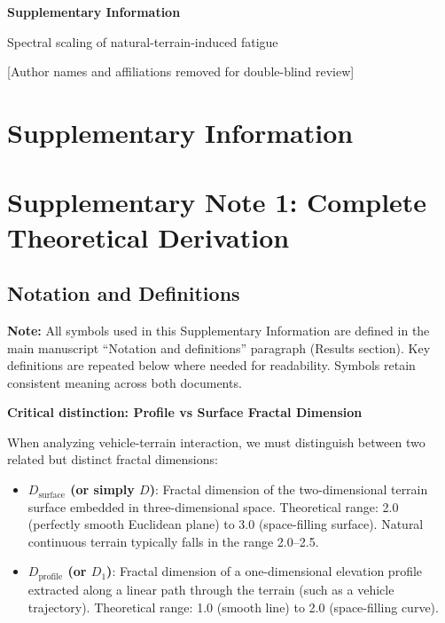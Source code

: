 \documentclass[11pt]{article}
\begin{document}
\begin{center}
{\Large\bfseries Supplementary Information}

\vspace{0.5cm}

{\large Spectral scaling of natural-terrain-induced fatigue}

\vspace{0.5cm}

[Author names and affiliations removed for double-blind review]

\end{center}

\vspace{1cm}


\clearpage
\appendix

\section{Supplementary Information}

\section{Supplementary Note 1: Complete Theoretical Derivation}

\subsection{Notation and Definitions}

\textbf{Note:} All symbols used in this Supplementary Information are defined in the main manuscript ``Notation and definitions'' paragraph (Results section). Key definitions are repeated below where needed for readability. Symbols retain consistent meaning across both documents.

\textbf{Critical distinction: Profile vs Surface Fractal Dimension}

When analyzing vehicle-terrain interaction, we must distinguish between two related but distinct fractal dimensions:

\begin{itemize}
\item \textbf{$D_{\text{surface}}$ (or simply $D$)}: Fractal dimension of the two-dimensional terrain surface embedded in three-dimensional space. Theoretical range: 2.0 (perfectly smooth Euclidean plane) to 3.0 (space-filling surface). Natural continuous terrain typically falls in the range 2.0--2.5.

\item \textbf{$D_{\text{profile}}$ (or $D_1$)}: Fractal dimension of a one-dimensional elevation profile extracted along a linear path through the terrain (such as a vehicle trajectory). Theoretical range: 1.0 (smooth line) to 2.0 (space-filling curve).
\end{itemize}
\end{document}
